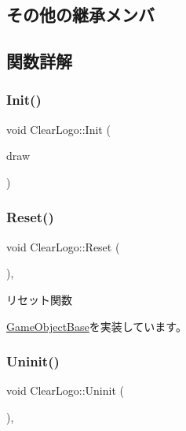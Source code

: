 \subsection*{その他の継承メンバ}


\subsection{関数詳解}
\mbox{\label{class_clear_logo_a46c1a948342d75bb418047a31e70999d}} 
\subsubsection{\texorpdfstring{Init()}{Init()}}
{\footnotesize\ttfamily void Clear\+Logo\+::\+Init (\begin{DoxyParamCaption}\item[{\mbox{\hyperlink{class_draw_base}{Draw\+Base}} $\ast$}]{draw }\end{DoxyParamCaption})}

\mbox{\label{class_clear_logo_aa19369cbace0cc79957ef7b4d4dbd0f5}} 
\subsubsection{\texorpdfstring{Reset()}{Reset()}}
{\footnotesize\ttfamily void Clear\+Logo\+::\+Reset (\begin{DoxyParamCaption}{ }\end{DoxyParamCaption})\hspace{0.3cm}{\ttfamily [override]}, {\ttfamily [virtual]}}



リセット関数 



\mbox{\hyperlink{class_game_object_base_a85c59554f734bcb09f1a1e18d9517dce}{Game\+Object\+Base}}を実装しています。

\mbox{\label{class_clear_logo_ab55def116615b92a8e8cc40b364b7a4c}} 
\subsubsection{\texorpdfstring{Uninit()}{Uninit()}}
{\footnotesize\ttfamily void Clear\+Logo\+::\+Uninit (\begin{DoxyParamCaption}{ }\end{DoxyParamCaption})\hspace{0.3cm}{\ttfamily [override]}, {\ttfamily [virtual]}}




